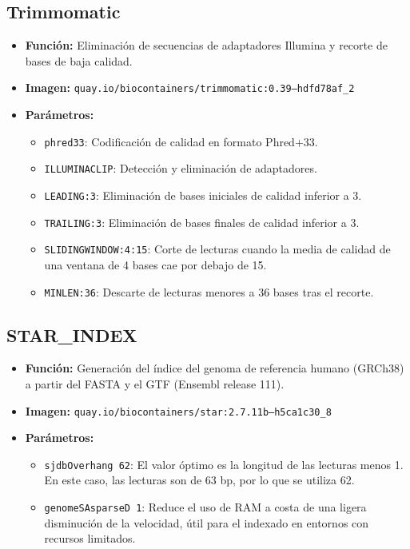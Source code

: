 \documentclass[11pt,a4paper]{article}
\begin{document}
\subsection{Trimmomatic}
\begin{itemize}
    \item \textbf{Función:} Eliminación de secuencias de adaptadores Illumina y recorte de bases de baja calidad.
    \item \textbf{Imagen:} \texttt{quay.io/biocontainers/trimmomatic:0.39--hdfd78af\_2}
    \item \textbf{Parámetros:}
    \begin{itemize}
        \item \texttt{phred33}: Codificación de calidad en formato Phred+33.
        \item \texttt{ILLUMINACLIP}: Detección y eliminación de adaptadores.
        \item \texttt{LEADING:3}: Eliminación de bases iniciales de calidad inferior a 3.
        \item \texttt{TRAILING:3}: Eliminación de bases finales de calidad inferior a 3.
        \item \texttt{SLIDINGWINDOW:4:15}: Corte de lecturas cuando la media de calidad de una ventana de 4 bases cae por debajo de 15.
        \item \texttt{MINLEN:36}: Descarte de lecturas menores a 36 bases tras el recorte.
    \end{itemize}
\end{itemize}

\subsection{STAR\_INDEX}
\begin{itemize}
    \item \textbf{Función:} Generación del índice del genoma de referencia humano (GRCh38) a partir del FASTA y el GTF (Ensembl release 111).
    \item \textbf{Imagen:} \texttt{quay.io/biocontainers/star:2.7.11b--h5ca1c30\_8}
    \item \textbf{Parámetros:}
    \begin{itemize}
        \item \texttt{sjdbOverhang 62}: El valor óptimo es la longitud de las lecturas menos 1. En este caso, las lecturas son de 63 bp, por lo que se utiliza 62.
        \item \texttt{genomeSAsparseD 1}: Reduce el uso de RAM a costa de una ligera disminución de la velocidad, útil para el indexado en entornos con recursos limitados.
    \end{itemize}
\end{itemize}
\end{document}
